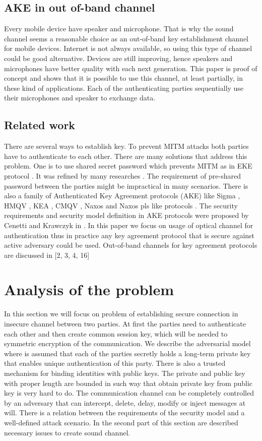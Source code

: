 \documentclass[11pt,titlepage]{article}
\theoremstyle{plain}
\begin{document}
\subsection{AKE in out of-band channel}
Every mobile device have speaker and microphone. That is why the sound channel seems a reasonable choice as an out-of-band key establishment channel for mobile devices. Internet is not always available, so using this type of channel could be good alternative. Devices are still improving, hence speakers and microphones have better quality with each next generation. This paper is proof of concept and shows that it is possible to use this channel, at least partially, in these kind of applications. Each of the authenticating parties sequentially use their microphones and speaker to exchange data.


\subsection{Related work}
There are several ways to establish key. To prevent MITM attacks both parties have to authenticate to each other. There are many solutions that address this problem. One is to use shared secret password which prevents MITM as in EKE protocol \cite{EKE}. It was refined by many researches \cite{EKE, EKE2}. The requirement of pre-shared password between the parties might be impractical in many scenarios. There is also a family of Authenticated Key Agreement protocols (AKE) like Sigma \cite{sign_mac}, HMQV \cite{HMQV}, KEA \cite{KEA}, CMQV \cite{CMQV}, Naxos and Naxos pls like protocols \cite{AMA, NAXOS}. The security requirements and security model definition in AKE protocols were proposed by Cenetti and Krawczyk in \cite{cankraw1, cankraw2}. In this paper we focus on usage of optical channel for authentication thus in practice any key agreement protocol that is secure against active adversary could be used. Out-of-band channels for key agreement protocols are discussed in [2, 3, 4, 16]

\section{Analysis of the problem}

In this section we will focus on problem of establishing secure connection in insecure channel between two parties. At first the parties need to authenticate each other and then create common session key, which will be needed to symmetric encryption of the communication. We describe the adversarial model where is assumed that each of the parties secretly holds a long-term private key that enables unique authentication of this party. There is also a trusted mechanism for binding identities with public keys. The private and public key with proper length are bounded in such way that obtain private key from public key is very hard to do. The communication channel can be completely controlled by an adversary that can intercept, delete, delay, modify or inject messages at will. There is a relation between the requirements of the security model and a well-defined attack scenario. In the second part of this section are described necessary issues to create sound channel.
\end{document}
